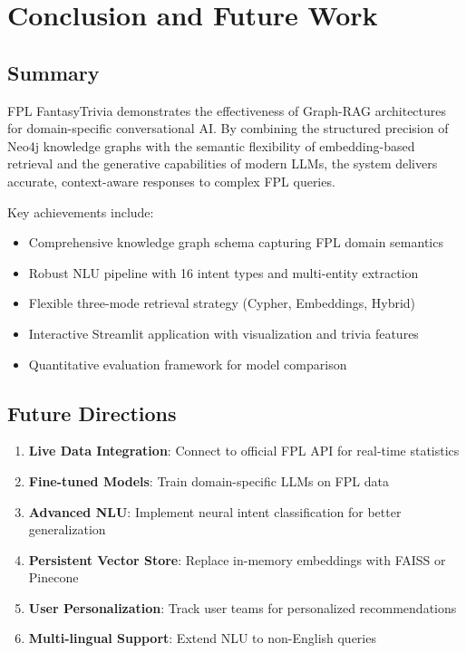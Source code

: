\documentclass[11pt, a4paper]{article}
\begin{document}
\section{Conclusion and Future Work}
\label{sec:conclusion}

\subsection{Summary}
FPL FantasyTrivia demonstrates the effectiveness of Graph-RAG architectures for domain-specific conversational AI. By combining the structured precision of Neo4j knowledge graphs with the semantic flexibility of embedding-based retrieval and the generative capabilities of modern LLMs, the system delivers accurate, context-aware responses to complex FPL queries.

Key achievements include:
\begin{itemize}
    \item Comprehensive knowledge graph schema capturing FPL domain semantics
    \item Robust NLU pipeline with 16 intent types and multi-entity extraction
    \item Flexible three-mode retrieval strategy (Cypher, Embeddings, Hybrid)
    \item Interactive Streamlit application with visualization and trivia features
    \item Quantitative evaluation framework for model comparison
\end{itemize}

\subsection{Future Directions}
\begin{enumerate}
    \item \textbf{Live Data Integration}: Connect to official FPL API for real-time statistics
    \item \textbf{Fine-tuned Models}: Train domain-specific LLMs on FPL data
    \item \textbf{Advanced NLU}: Implement neural intent classification for better generalization
    \item \textbf{Persistent Vector Store}: Replace in-memory embeddings with FAISS or Pinecone
    \item \textbf{User Personalization}: Track user teams for personalized recommendations
    \item \textbf{Multi-lingual Support}: Extend NLU to non-English queries
\end{enumerate}
\end{document}
